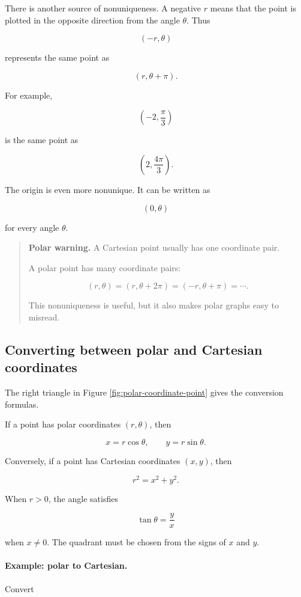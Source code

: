 There is another source of nonuniqueness.  A negative \(r\) means that the point is
plotted in the opposite direction from the angle \(\theta\).  Thus

\[
(-r,\theta)
\]

represents the same point as

\[
(r,\theta+\pi).
\]

For example,

\[
\left(-2,\frac{\pi}{3}\right)
\]

is the same point as

\[
\left(2,\frac{4\pi}{3}\right).
\]

The origin is even more nonunique.  It can be written as

\[
(0,\theta)
\]

for every angle \(\theta\).

\begin{quote}
\textbf{Polar warning.}
A Cartesian point usually has one coordinate pair.

A polar point has many coordinate pairs:

\[
(r,\theta)=(r,\theta+2\pi)=(-r,\theta+\pi)=\cdots.
\]

This nonuniqueness is useful, but it also makes polar graphs easy to misread.
\end{quote}

\subsection{Converting between polar and Cartesian coordinates}
\label{subsec:polar-cartesian-conversion}

The right triangle in Figure \ref{fig:polar-coordinate-point} gives the conversion formulas.

If a point has polar coordinates \((r,\theta)\), then

\[
\boxed{
x=r\cos\theta,
\qquad
y=r\sin\theta.
}
\]

Conversely, if a point has Cartesian coordinates \((x,y)\), then

\[
\boxed{
r^2=x^2+y^2.
}
\]

When \(r>0\), the angle satisfies

\[
\boxed{
\tan\theta=\frac{y}{x}
}
\]

when \(x\neq0\).  The quadrant must be chosen from the signs of \(x\) and \(y\).

\paragraph{Example: polar to Cartesian.}
Convert

